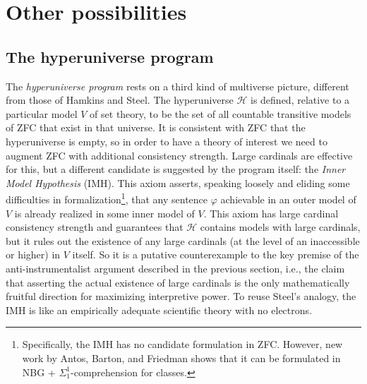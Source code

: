 \documentclass[letterpaper,12pt]{article}
\renewcommand{\phi}{\varphi}
\begin{document}

\section{Other possibilities}
\subsection{The hyperuniverse program}
\label{hyperuniverse}
The \emph{hyperuniverse program} \citep{arrigoni2013hyperuniverse} rests on a third kind of multiverse picture, different from those of Hamkins and Steel. The hyperuniverse $\mathcal{H}$ is defined, relative to a particular model $V$ of set theory, to be the set of all countable transitive models of ZFC that exist in that universe. It is consistent with ZFC that the hyperuniverse is empty, so in order to have a theory of interest we need to augment ZFC with additional consistency strength. Large cardinals are effective for this, but a different candidate is suggested by the program itself: the \emph{Inner Model Hypothesis} (IMH). This axiom asserts, speaking loosely and eliding some difficulties in formalization\footnote{Specifically, the IMH has no candidate formulation in ZFC. However, new work by Antos, Barton, and Friedman shows that it can be formulated in NBG + $\Sigma^1_1$-comprehension for classes.}, that any sentence $\phi$ achievable in an outer model of $V$ is already realized in some inner model of $V$. This axiom has large cardinal consistency strength and guarantees that $\mathcal{H}$ contains models with large cardinals, but it rules out the existence of any large cardinals (at the level of an inaccessible or higher) in $V$ itself. So it is a putative counterexample to the key premise of the anti-instrumentalist argument described in the previous section, i.e., the claim that asserting the actual existence of large cardinals is the only mathematically fruitful direction for maximizing interpretive power. To reuse Steel's analogy, the IMH is like an empirically adequate scientific theory with no electrons.
\end{document}
